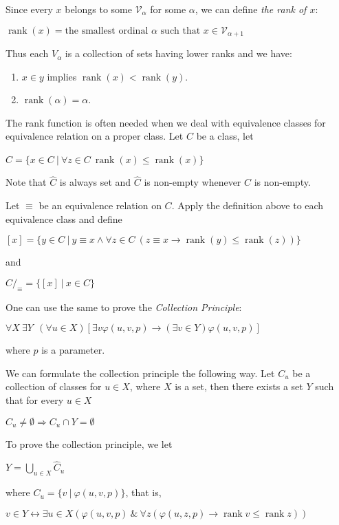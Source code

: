 \documentclass[8pt]{article}
\theoremstyle{definition}
\theoremstyle{definition}
\theoremstyle{definition}
\theoremstyle{definition}
\theoremstyle{definition}
\theoremstyle{definition}
\theoremstyle{definition}
\theoremstyle{definition}
\theoremstyle{definition}
\theoremstyle{definition}
\theoremstyle{definition}
\theoremstyle{definition}
\theoremstyle{definition}
\theoremstyle{definition}
\theoremstyle{question}
\begin{document}
Since every $x$ belongs to some $\mathcal{V}_{\alpha}$ for some $\alpha$, we can define \emph{the rank of $x$}:
\begin{center}
  $\operatorname{rank}(x) = \text{the smallest ordinal $\alpha$ such that $x \in \mathcal{V}_{\alpha + 1}$}$
\end{center}
Thus each $V_{\alpha}$ is a collection of sets having lower ranks and we have:
\begin{enumerate}
  \item $x \in y$ implies $\operatorname{rank}(x) < \operatorname{rank}(y)$.
  \item $\operatorname{rank}(\alpha)=\alpha$.
\end{enumerate}

The rank function is often needed when we deal with equivalence classes for equivalence relation on a proper class.
Let $C$ be a class, let
\begin{center}
  $\hat{C} = \{ x \in C \: | \: \forall z \in C \: \operatorname{rank}(x) \leq \operatorname{rank}(x) \}$
\end{center}
Note that $\hat{C}$ is always set and $\hat{C}$ is non-empty whenever $C$ is non-empty.

Let $\equiv$ be an equivalence relation on $C$. Apply the definition above to each equivalence class and define
\begin{center}
  $[x] = \{ y \in C \: | \: y \equiv x \land \forall z \in C \: (z \equiv x \to \operatorname{rank}(y) \leq \operatorname{rank}(z)) \}$
\end{center}
and
\begin{center} 
$C/_{\equiv} = \{ [x] \: | \: x \in C \}$
\end{center}

One can use the same to prove the \emph{Collection Principle}:
\begin{center}
  $\forall X \: \exists Y \:\: (\forall u \in X) [\exists v \varphi(u, v, p) \to (\exists v \in Y) \varphi(u, v, p)]$
\end{center}
where $p$ is a parameter.

We can formulate the collection principle the following way. 
Let $C_u$ be a collection of classes for $u \in X$, where $X$ is a set, then
there exists a set $Y$ such that for every $u \in X$
\begin{center}
  $C_u \neq \emptyset \Rightarrow C_u \cap Y = \emptyset$
\end{center}

To prove the collection principle, we let
\begin{center}
  $Y = \bigcup \limits_{u \in X} \hat{C}_u$
\end{center}
where $C_u = \{ v \: | \: \varphi(u, v, p) \}$, that is, 
\begin{center}
  $v \in Y \leftrightarrow \exists u \in X (\varphi(u, v, p) \: \& \: \forall z (\varphi(u, z, p) \to \operatorname{rank} v \leq \operatorname{rank} z))$
\end{center}
\end{document}

